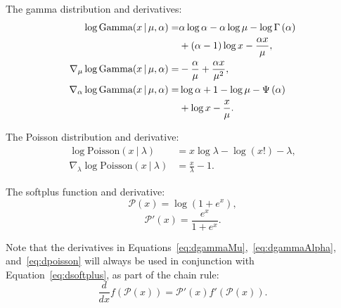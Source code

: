 The gamma distribution and derivatives:
\begin{align}
\log\mbox{Gamma}(x \g \mu, \alpha) = & 
\alpha\log\alpha - \alpha\log\mu - \log\Gamma \left(\alpha\right)\nonumber \\
& + (\alpha-1)\log x - \frac{\alpha x}{\mu}, \label{eq:gamma} \\
\nabla_\mu \log\mbox{Gamma}(x \g \mu, \alpha) =&
-\frac{\alpha}{\mu} + \frac{\alpha x}{\mu^2},\label{eq:dgammaMu} \\
\nabla_\alpha \log\mbox{Gamma}(x \g \mu, \alpha) =& 
\log\alpha + 1 - \log\mu - \Psi \left(\alpha\right) \nonumber \\
& + \log x - \frac{x}{\mu}. \label{eq:dgammaAlpha}%
\end{align}

The Poisson distribution and derivative:
\begin{align}
\log\mbox{Poisson}(x~\vert~\lambda) &= x\log\lambda - \log(x!) - \lambda, \label{eq:poisson} \\
\nabla_\lambda \log\mbox{Poisson}(x~\vert~\lambda) &= \frac{x}{\lambda} -1.\label{eq:dpoisson}
\end{align}

The softplus function and derivative:
\[\mathcal{P}(x) = \log(1+e^x),\]
\begin{equation}
\mathcal{P}'(x) = \frac{e^x}{1+e^x}.
\label{eq:dsoftplus}
\end{equation}

Note that the derivatives in Equations~\ref{eq:dgammaMu},~\ref{eq:dgammaAlpha}, and~\ref{eq:dpoisson} will always be used in conjunction with Equation~\ref{eq:dsoftplus}, as part of the chain rule:
\begin{equation}
\frac{d}{dx} f(\mathcal{P}(x)) = \mathcal{P}'(x)f'(\mathcal{P}(x)).
\label{eq:chain}
\end{equation}



